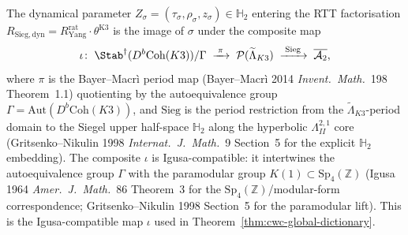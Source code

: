 \begin{remark}
\label{rem:cwc-iota-map}
The dynamical parameter $Z_\sigma=(\tau_\sigma,\rho_\sigma,z_\sigma)
\in\mathbb{H}_2$ entering the RTT factorisation
$R_{\mathrm{Sieg,dyn}}=R^{\mathrm{rat}}_{\mathrm{Yang}}\cdot
\theta^{\mathrm{K3}}$ is the image of $\sigma$ under the composite map
\[
 \iota\colon\;
 \Stab^\dagger(D^b\mathrm{Coh}(K3))/\Gamma
 \;\xrightarrow{\;\pi\;}\;
 \mathcal{P}(\widetilde{\Lambda}_{K3})
 \;\xrightarrow{\;\mathrm{Sieg}\;}\;
 \overline{\mathcal{A}_2},
\]
where $\pi$ is the Bayer--Macr\`i period map (Bayer--Macr\`i 2014
\emph{Invent.\ Math.}~198 Theorem~1.1) quotienting by the autoequivalence
group $\Gamma=\mathrm{Aut}(D^b\mathrm{Coh}(K3))$, and $\mathrm{Sieg}$
is the period restriction from the $\widetilde{\Lambda}_{K3}$-period
domain to the Siegel upper half-space $\mathbb{H}_2$ along the hyperbolic
$\Lambda^{2,1}_{II}$ core (Gritsenko--Nikulin 1998
\emph{Internat.\ J.\ Math.}~9 Section~5 for the explicit $\mathbb{H}_2$
embedding). The composite $\iota$ is Igusa-compatible: it intertwines
the autoequivalence group $\Gamma$ with the paramodular group
$K(1)\subset\mathrm{Sp}_4(\mathbb{Z})$
(Igusa 1964 \emph{Amer.\ J.\ Math.}~86 Theorem~3 for the
$\mathrm{Sp}_4(\mathbb{Z})$/modular-form correspondence;
Gritsenko--Nikulin 1998 Section~5 for the paramodular lift). This is the
Igusa-compatible map $\iota$ used in
Theorem~\ref{thm:cwc-global-dictionary}.
\end{remark}

